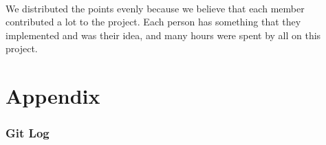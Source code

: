 \documentclass[a4paper,11pt,titlepage]{article}
\begin{document}
\paragraph{}
We distributed the points evenly because we believe that each member contributed a lot to the project. Each person has something that they implemented and was their idea, and many hours were spent by all on this project.

\part{Appendix}
\section{Git Log}


\newpage


\end{document}
